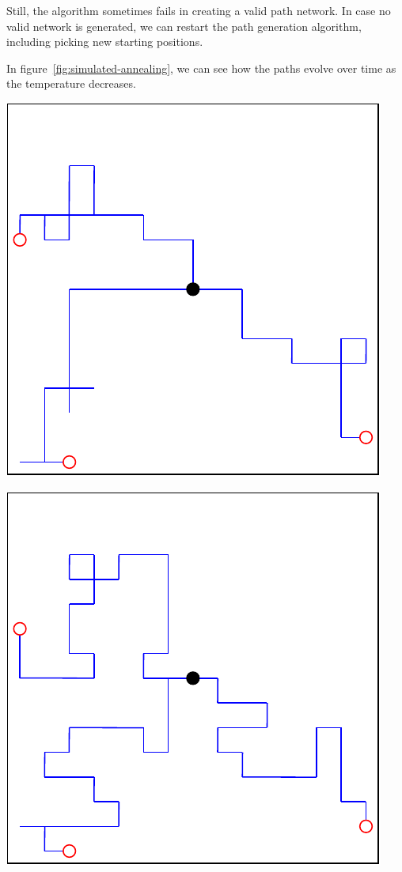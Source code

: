 Still, the algorithm sometimes fails in creating a valid path network.
In case no valid network is generated, we can restart the path generation algorithm, including picking new starting positions.

In figure~\ref{fig:simulated-annealing}, we can see how the paths evolve over time as the temperature decreases.
\begin{center}
    \captionsetup{type=figure}
    \begin{minipage}{.5\textwidth}
        \centering
        \includegraphics[width=0.95\linewidth]{img/SA initial state.pdf}
    \end{minipage}%
    \begin{minipage}{.5\textwidth}
        \centering
        \includegraphics[width=0.95\linewidth]{img/SA temp 2.pdf}

\end{minipage}
\end{center}
